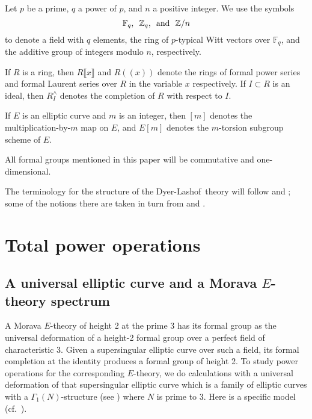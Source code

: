 \documentclass{gtpart}
\theoremstyle{definition}
\theoremstyle{remark}
\newcommand{\mb}[1]{\mathbb{#1}}
\newcommand{\DL}{Dyer-Lashof~}
\newcommand{\BF}{{\mb F}}
\newcommand{\BZ}{{\mb Z}}
\newcommand{\ad}{{\rm and}}
\newcommand{\G}{\Gamma}
\begin{document}
Let $p$ be a prime, $q$ a power of $p$, and $n$ a positive integer.  We 
use the symbols 
\[
 \BF_q\text{,}~~\BZ_q\text{,}~~\ad~~\BZ/n 
\]
to denote a field with $q$ elements, the ring of $p$-typical Witt 
vectors over $\BF_q$, and the additive group of integers modulo $n$, 
respectively.  

If $R$ is a ring, then $R\llbracket x \rrbracket$ and $R (\!(x)\!)$ 
denote the rings of formal power series and formal Laurent series over 
$R$ in the variable $x$ respectively.  If $I \subset R$ is an ideal, 
then $R_I^\wedge$ denotes the completion of $R$ with respect to $I$.  

If $E$ is an elliptic curve and $m$ is an integer, then $[m]$ denotes 
the multiplication-by-$m$ map on $E$, and $E[m]$ denotes the $m$-torsion 
subgroup scheme of $E$.  

All formal groups mentioned in this paper will be commutative and 
one-dimensional.  

The terminology for the structure of the \DL theory will follow 
\cite{cong} and \cite{h2p2}; some of the notions there are taken in turn 
from \cite{BW} and \cite{V}.  


\section{Total power operations}
\label{sec:total}

\subsection{A universal elliptic curve and a Morava $E$-theory spectrum}
\label{subsec:ec}

A Morava $E$-theory of height 2 at the prime 3 has its formal group as 
the universal deformation of a height-2 formal group over a perfect 
field of characteristic 3.  Given a supersingular elliptic curve over 
such a field, its formal completion at the identity produces a formal 
group of height 2.  To study power operations for the corresponding 
$E$-theory, we do calculations with a universal deformation of that 
supersingular elliptic curve which is a family of elliptic curves with a 
$\G_1(N)$-structure (see \cite[Section 3.2]{KM}) where $N$ is prime to 3.  
Here is a specific model (cf.~\cite[4(4.6a)]{husemoller}).  
\end{document}
